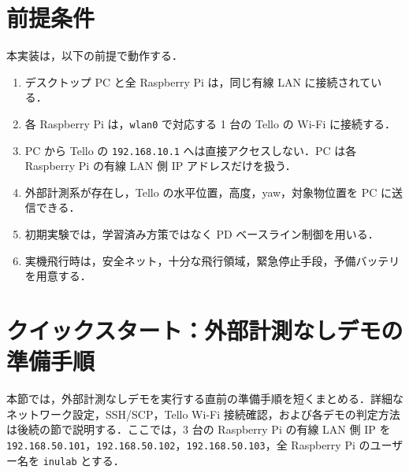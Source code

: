 \section{前提条件}
\label{sec:assumptions}

本実装は，以下の前提で動作する．

\begin{enumerate}[label=\arabic*.]
  \item デスクトップ PC と全 Raspberry Pi は，同じ有線 LAN に接続されている．
  \item 各 Raspberry Pi は，\texttt{wlan0} で対応する 1 台の Tello の Wi-Fi に接続する．
  \item PC から Tello の \texttt{192.168.10.1} へは直接アクセスしない．PC は各 Raspberry Pi の有線 LAN 側 IP アドレスだけを扱う．
  \item 外部計測系が存在し，Tello の水平位置，高度，yaw，対象物位置を PC に送信できる．
  \item 初期実験では，学習済み方策ではなく PD ベースライン制御を用いる．
  \item 実機飛行時は，安全ネット，十分な飛行領域，緊急停止手段，予備バッテリを用意する．
\end{enumerate}


\section{クイックスタート：外部計測なしデモの準備手順}
\label{sec:quick_start_no_tracker}

本節では，外部計測なしデモを実行する直前の準備手順を短くまとめる．詳細なネットワーク設定，SSH/SCP，Tello Wi-Fi 接続確認，および各デモの判定方法は後続の節で説明する．ここでは，3 台の Raspberry Pi の有線 LAN 側 IP を \texttt{192.168.50.101}，\texttt{192.168.50.102}，\texttt{192.168.50.103}，全 Raspberry Pi のユーザー名を \texttt{inulab} とする．

